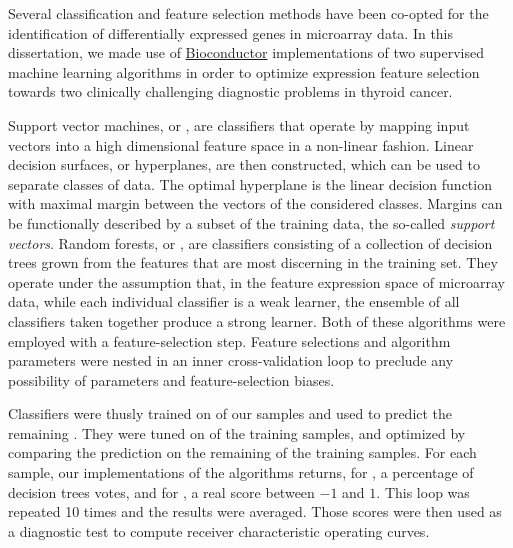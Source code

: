 Several classification and feature selection methods have been co-opted for the
identification of differentially expressed genes in microarray
data.\cite{pirooznia_comparative_2008} In this dissertation, we made use of
\href{http://www.bioconductor.org/}{\textsf{Bioconductor}} implementations of
two supervised machine learning algorithms in order to optimize expression
feature selection towards two clinically challenging diagnostic problems in
thyroid cancer.

Support vector machines, or , are classifiers that operate by
mapping input vectors into a high dimensional feature space in a non-linear
fashion.  Linear decision surfaces, or hyperplanes, are then constructed, which
can be used to separate classes of data.  The optimal hyperplane is the linear
decision function with maximal margin between the vectors of the considered
classes.  Margins can be functionally described by a subset of the training
data, the so-called \emph{support vectors}.\cite{cortes_support-vector_1995}
Random forests, or , are classifiers consisting of a collection of
decision trees grown from the features that are most discerning in the training
set.\cite{breiman_random_2001} They operate under the assumption that, in the
feature expression space of microarray data, while each individual classifier is
a weak learner, the ensemble of all classifiers taken together produce a strong
learner.  Both of these algorithms were employed with a feature-selection step.
Feature selections and algorithm parameters were nested in an inner
cross-validation loop to preclude any possibility of parameters and
feature-selection biases.\cite{johannes_mcrestimate:_2010}

Classifiers were thusly trained on  of our samples and used to
predict the remaining .  They were tuned on  of the
training samples, and optimized by comparing the prediction on the remaining
 of the training samples.  For each sample, our implementations of
the algorithms returns, for , a percentage of decision trees
votes, and for , a real score between $-1$ and $1$.  This loop
was repeated 10 times and the results were averaged.  Those scores were then
used as a diagnostic test to compute receiver characteristic operating curves.

